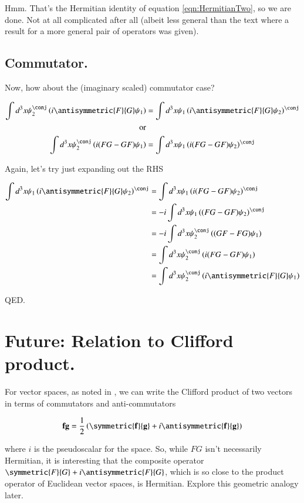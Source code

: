 \documentclass{article}
\begin{document}
Hmm.  That's the Hermitian identity of equation \ref{eqn:HermitianTwo}, so we are done.  Not at all complicated after all (albeit less
general than the text where a result for a more general pair of operators was given).

\subsection{Commutator. }

Now, how about the (imaginary scaled) commutator case?

\begin{align*}
\int d^3 x \psi_2^\conj \left( i \antisymmetric{F}{G} \psi_1 \right) &= \int d^3 x \psi_1 \left( i \antisymmetric{F}{G} \psi_2 \right)^\conj \\
\text{or} \\
\int d^3 x \psi_2^\conj \left( i(F G - G F) \psi_1 \right) &= \int d^3 x \psi_1 \left(i(F G - G F) \psi_2 \right)^\conj \\
\end{align*}

Again, let's try just expanding out the RHS

\begin{align*}
\int d^3 x \psi_1 \left( i \antisymmetric{F}{G} \psi_2 \right)^\conj 
&= \int d^3 x \psi_1 \left(i(F G - G F) \psi_2 \right)^\conj \\
&= -i \int d^3 x \psi_1 \left((F G - G F) \psi_2 \right)^\conj \\
&= -i \int d^3 x \psi_2^\conj \left((G F - F G) \psi_1 \right) \\
&= \int d^3 x \psi_2^\conj \left(i (F G - G F) \psi_1 \right) \\
&= \int d^3 x \psi_2^\conj \left(i \antisymmetric{F}{G}\psi_1 \right) \\
\end{align*}

QED.

\section{Future: Relation to Clifford product. }

For vector spaces, as noted in \cite{PJpauliMatrix},
we can write the Clifford product of two  vectors in terms of commutators and anti-commutators

\begin{align*}
\Bf \Bg = \inv{2} \left( \symmetric{\Bf}{\Bg} + i \antisymmetric{\Bf}{\Bg} \right)
\end{align*}

where $i$ is the pseudoscalar for the space.  So, while $FG$ isn't necessarily Hermitian, it is interesting that the composite operator
$\symmetric{F}{G} + i \antisymmetric{F}{G}$, which is so close to the product operator of Euclidean vector spaces, is Hermitian.
Explore this geometric analogy later.



\end{document}

